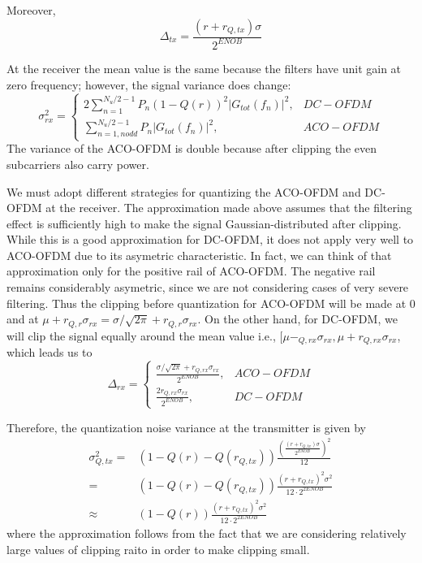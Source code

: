 \documentclass[a4paper]{article}
\begin{document}
Moreover, 
\begin{equation}
\Delta_{tx} = \frac{(r + r_{Q,tx})\sigma}{2^{ENOB}}
\end{equation}


At the receiver the mean value is the same because the filters have unit gain at zero frequency; however, the signal variance does change:
\begin{equation}
\sigma_{rx}^2 = \begin{cases}
2\sum_{n = 1}^{N_u/2-1}P_n(1-Q(r))^2|G_{tot}(f_n)|^2, & DC-OFDM \\
\sum_{n = 1, n odd}^{N_u/2-1}P_n|G_{tot}(f_n)|^2, & ACO-OFDM
\end{cases}
\end{equation}
The variance of the ACO-OFDM is double because after clipping the even subcarriers also carry power.

We must adopt different strategies for quantizing the ACO-OFDM and DC-OFDM at the receiver. The approximation made above assumes that the filtering effect is sufficiently high to make the signal Gaussian-distributed after clipping. While this is a good approximation for DC-OFDM, it does not apply very well to ACO-OFDM due to its asymetric characteristic. In fact, we can think of that approximation only for the positive rail of ACO-OFDM. The negative rail remains considerably asymetric, since we are not considering cases of very severe filtering. Thus the clipping before quantization for ACO-OFDM will be made at 0 and at $\mu + r_{Q,r}\sigma_{rx} = \sigma/\sqrt{2\pi} + r_{Q,r}\sigma_{rx}$. On the other hand, for DC-OFDM, we will clip the signal equally around the mean value i.e., $[\mu - _{Q,rx}\sigma_{rx}, \mu + r_{Q,rx}\sigma_{rx}$, which leads us to
\begin{equation}
\Delta_{rx} = \begin{cases}
\frac{\sigma/\sqrt{2\pi} + r_{Q,rx}\sigma_{rx}}{2^{ENOB}}, & ACO-OFDM \\
\frac{2r_{Q,rx}\sigma_{rx}}{2^{ENOB}}, & DC-OFDM 
\end{cases}
\end{equation}

Therefore, the quantization noise variance at the transmitter is given by
\begin{align} \nonumber
\sigma^2_{Q, tx} = & (1-Q(r)-Q(r_{Q,tx}))\frac{(\frac{(r + r_{Q,tx})\sigma}{2^{ENOB}})^2}{12} \\ \nonumber
= & (1-Q(r)-Q(r_{Q,tx}))\frac{(r + r_{Q,tx})^2\sigma^2}{12\cdot 2^{2ENOB}} \\ 
\approx & (1-Q(r))\frac{(r + r_{Q,tx})^2\sigma^2}{12\cdot 2^{2ENOB}}
\end{align}
where the approximation follows from the fact that we are considering relatively large values of clipping raito in order to make clipping small.
\end{document}
